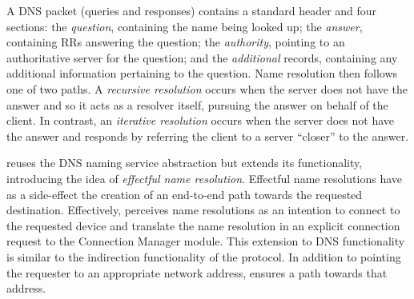 A DNS packet (queries and responses)  contains a standard header and four
sections: the \emph{question}, containing the name being looked up; the
\emph{answer}, containing RRs answering the question; the \emph{authority},
pointing to an authoritative server for the question; and the \emph{additional}
records, containing any additional information pertaining to the question. Name
resolution then follows one of two paths. A \emph{recursive resolution} occurs
when the server does not have the answer and so it acts as a resolver itself,
pursuing the answer on behalf of the client. In contrast, an \emph{iterative
  resolution} occurs when the server does not have the answer and responds by
referring the client to a server ``closer'' to the answer.

\signpost reuses the DNS naming service abstraction but extends its
functionality, introducing the idea of \textit{effectful name resolution}.
Effectful name resolutions have as a side-effect  the creation of an end-to-end
path towards the requested destination.  Effectively, \signpost perceives name
resolutions as an intention to connect to the requested device and translate the
name resolution in an explicit connection request to the Connection Manager
module. This extension to DNS functionality is similar to the indirection
functionality of the protocol. In addition to pointing the requester to an
appropriate network address, \signpost ensures a path towards that address. 



